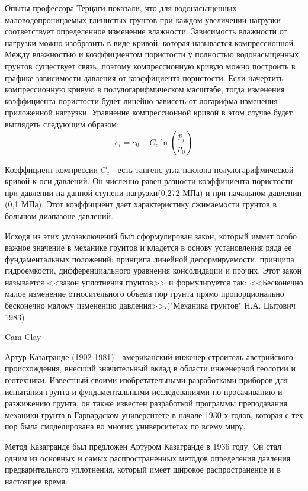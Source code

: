  Опыты профессора Терцаги показали, что для водонасыщенных маловодопроницаемых глинистых грунтов при каждом увеличении нагрузки соответствует определенное изменение влажности. Зависимость влажности от нагрузки можно изобразить в виде кривой, которая называется компрессионной. Между влажностью и коэффициентом пористости у полностью водонасыщенных грунтов существует связь, поэтому компрессионную кривую можно построить в графике зависимости давления от коэффициента пористости. Если начертить компрессионную кривую в полулогарифмическом масштабе, тогда изменения коэффициента пористости будет линейно зависеть от логарифма изменения приложенной нагрузки. Уравнение компрессионной кривой в этом случае будет выглядеть следующим образом:
 $$e_i=e_0-C_c\ln(\frac{p_i}{p_0})$$
 
 
 Коэффициент компрессии $C_c$ - есть тангенс угла наклона полулогарифмической кривой к оси давлений. Он численно равен разности коэффициента пористости при давлении на данной ступени нагрузки(0,272 МПа) и при начальном давлении (0,1 МПа). Этот коэффициент дает характеристику сжимаемости грунтов в большом диапазоне давлений. 
 
 Исходя из этих умозаключений был сформулирован закон, который иммет особо важное значение в механике грунтов и кладется в основу установления ряда ее фундаментальных положений: принципа линейной деформируемости, принципа гидроемкости, дифференциального уравнения консолидации и прочих. Этот закон называется <<закон уплотнения грунтов>> и формулируется так: <<Бесконечно малое изменение относительного объема пор грунта прямо пропорционально бесконечно малому изменению давления>>.("Механика грунтов" Н.А. Цытович 1983)

 Cam Clay


 
 Артур Казагранде (1902-1981) - американский инженер-строитель австрийского происхождения, внесший значительный вклад в области инженерной геологии и геотехники. Известный своими изобретательными разработками приборов для испытания грунта и фундаментальными исследованиями по просачиванию и разжижению грунта, он также известен разработкой программы преподавания механики грунта в Гарвардском университете в начале 1930-х годов, которая с тех пор была смоделирована во многих университетах по всему миру. 
 
 Метод Казагранде был предложен Артуром Казагранде в 1936 году. Он стал одним из основных и самых распространенных методов определения давления предварительного уплотнения, который имеет широкое распространение и в настоящее время. 

